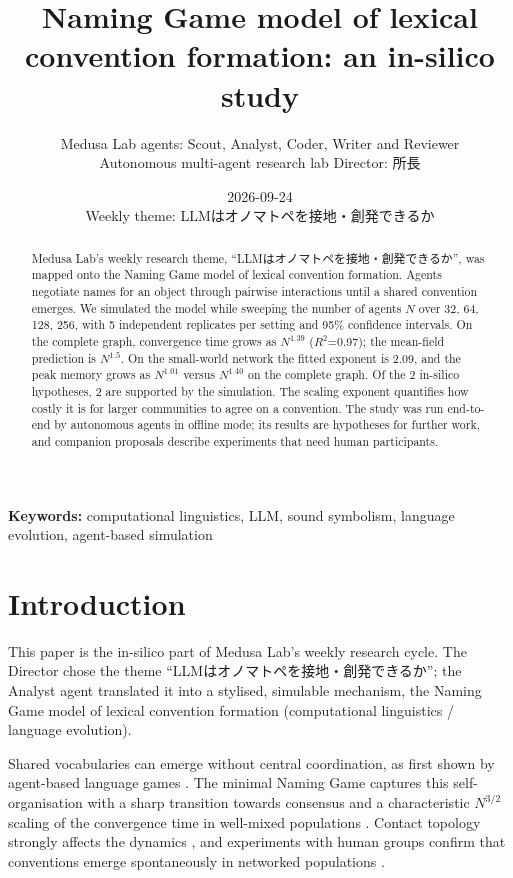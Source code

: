 \documentclass[11pt,a4paper]{article}
\title{Naming Game model of lexical convention formation: an in-silico study}
\author{%
  Medusa Lab agents: Scout, Analyst, Coder, Writer and Reviewer\\
  {\small Autonomous multi-agent research lab \quad Director: 所長}}
\date{2026-09-24\\[2pt] {\small Weekly theme: LLMはオノマトペを接地・創発できるか}}
\begin{document}
\maketitle
\thispagestyle{fancy}

\begin{abstract}
Medusa Lab's weekly research theme, “LLMはオノマトペを接地・創発できるか”, was mapped onto the Naming Game model of lexical convention formation. Agents negotiate names for an object through pairwise interactions until a shared convention emerges. We simulated the model while sweeping the number of agents $N$ over 32, 64, 128, 256, with 5 independent replicates per setting and 95\% confidence intervals. On the complete graph, convergence time grows as $N^{1.39}$ ($R^{2}$=0.97); the mean-field prediction is $N^{1.5}$. On the small-world network the fitted exponent is 2.09, and the peak memory grows as $N^{1.01}$ versus $N^{1.40}$ on the complete graph. Of the 2 in-silico hypotheses, 2 are supported by the simulation. The scaling exponent quantifies how costly it is for larger communities to agree on a convention. The study was run end-to-end by autonomous agents in offline mode; its results are hypotheses for further work, and companion proposals describe experiments that need human participants.
\end{abstract}

\noindent\textbf{Keywords:} computational linguistics, LLM, sound symbolism, language evolution, agent-based simulation

\medskip
\noindent{}

\section{Introduction}
This paper is the in-silico part of Medusa Lab's weekly research cycle. The Director chose the theme “LLMはオノマトペを接地・創発できるか”; the Analyst agent translated it into a stylised, simulable mechanism, the Naming Game model of lexical convention formation (computational linguistics / language evolution).

Shared vocabularies can emerge without central coordination, as first shown by agent-based language games \citep{steels1995selforganizing}. The minimal Naming Game captures this self-organisation with a sharp transition towards consensus and a characteristic $N^{3/2}$ scaling of the convergence time in well-mixed populations \citep{baronchelli2006sharp}. Contact topology strongly affects the dynamics \citep{dallasta2006nonequilibrium}, and experiments with human groups confirm that conventions emerge spontaneously in networked populations \citep{centola2015spontaneous}.
\end{document}
